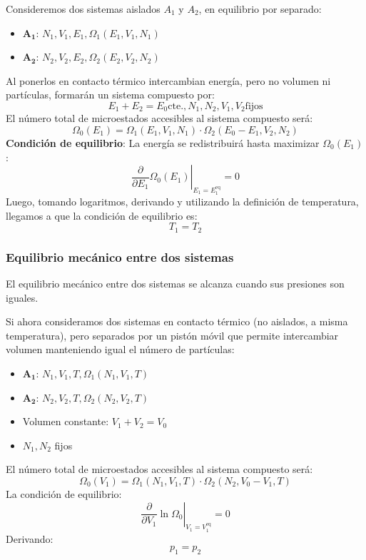 \documentclass[]{article}
\numberwithin{equation}{section}
\newcommand{\0}{\textcolor{gray}{0}}
\begin{document}
Consideremos dos sistemas aislados \(A_1\) y \(A_2\), en equilibrio por separado:
\begin{itemize}
	\item \(\mathbf{A_1}\): \(N_1, V_1, E_1, \Omega_1(E_1,V_1,N_1)\)
	\item \(\mathbf{A_2}\): \(N_2, V_2, E_2, \Omega_2(E_2,V_2,N_2)\)
\end{itemize}
Al ponerlos en contacto térmico intercambian energía, pero no volumen ni partículas, formarán un sistema compuesto por:
\begin{equation*}
	E_1 + E_2 = E_0 \text{cte.}, N_1,N_2,V_1,V_2 \text{fijos}
\end{equation*}
El número total de microestados accesibles al sistema compuesto será:
\begin{equation}
	\Omega_0(E_1) = \Omega_1(E_1,V_1,N_1)\cdot\Omega_2(E_0-E_1,V_2,N_2)
\end{equation}
\textbf{Condición de equilibrio}: La energía se redistribuirá hasta maximizar \(\Omega_0(E_1)\):
\begin{equation}
	\left. \frac{\partial}{\partial E_1}\Omega_0(E_1)\right|_{E_1 = E_1^{\text{eq}}} = 0
\end{equation}
Luego, tomando logaritmos, derivando y utilizando la definición de temperatura, llegamos a que la condición de equilibrio es:
\begin{equation}
	T_1  = T_2
\end{equation}

\subsubsection{Equilibrio mecánico entre dos sistemas}
El equilibrio mecánico entre dos sistemas se alcanza cuando sus presiones son iguales.

Si ahora consideramos dos sistemas en contacto térmico (no aislados, a misma temperatura), pero separados por un pistón móvil que permite intercambiar volumen manteniendo igual el número de partículas:
\begin{itemize}
	\item \(\mathbf{A_1}\): \(N_1, V_1, T, \Omega_1(N_1,V_1,T)\)
	\item \(\mathbf{A_2}\): \(N_2, V_2, T, \Omega_2(N_2,V_2,T)\)
	\item Volumen constante: \(V_1 + V_2 = V_0\)
	\item \(N_1, N_2\) fijos
\end{itemize}
El número total de microestados accesibles al sistema compuesto será:
\begin{equation*}
	\Omega_0(V_1) = \Omega_1(N_1,V_1,T)\cdot\Omega_2(N_2,V_0-V_1,T)
\end{equation*}
La condición de equilibrio:
\begin{equation*}
	\left. \frac{\partial}{\partial V_1}\ln{\Omega_0}\right|_{V_1 = V_1^{\text{eq}}} = 0
\end{equation*}
Derivando:
\begin{equation}
	p_1 = p_2
\end{equation}
\end{document}
